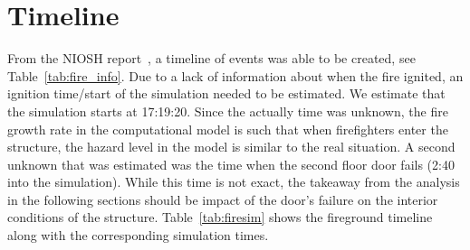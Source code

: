 \documentclass[11pt,oneside]{book}
\begin{document}
\section{Timeline}
\label{timeline}
From the NIOSH report~\cite{NIOSH:Bowyer}, a timeline of events was able to be created, see Table~\ref{tab:fire_info}. Due to a lack of information about when the fire ignited, an ignition time/start of the simulation needed to be estimated.  We estimate that the simulation starts at 17:19:20. Since the actually time was unknown, the fire growth rate in the computational model is such that when firefighters enter the structure, the hazard level in the model is similar to the real situation. A second unknown that was estimated was the time when the second floor door fails (2:40 into the simulation). While this time is not exact, the takeaway from the analysis in the following sections should be impact of the door's failure on the interior conditions of the structure. Table~\ref{tab:firesim} shows the fireground timeline along with the corresponding simulation times.
\end{document}
